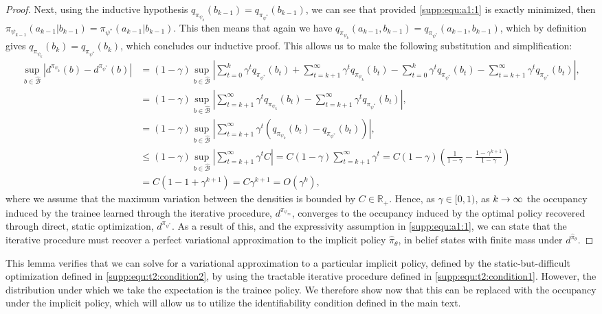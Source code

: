 \begin{proof}
    Next, using the inductive hypothesis $q_{\pi_{\psi_k}}(b_{k-1}) = q_{\pi_{\psi^*}}(b_{k-1})$, we can see that provided \eqref{supp:equ:a1:1} is exactly minimized, then $\pi_{\psi_{k-1}}(a_{k-1}|b_{k-1}) = \pi_{\psi^*}(a_{k-1}|b_{k-1})$. This then means that again we have $q_{\pi_{\psi_k}}(a_{k-1},b_{k-1}) = q_{\pi_{\psi^*}}(a_{k-1},b_{k-1})$, which by definition gives $q_{\pi_{\psi_k}}(b_{k}) = q_{\pi_{\psi^*}}(b_{k})$, which concludes our inductive proof. This allows us to make the following substitution and simplification:
    \begin{align}
        \sup_{b \in \hat{\mathcal{B}}} \left|d^{\pi_{\psi_k}}(b)-d^{\pi_{\psi^*}}(b)\right| &= (1-\gamma) \sup_{b \in \hat{\mathcal{B}}} \left| \sum_{t=0}^{k} \gamma^t q_{\pi_{\psi^*}}(b_t) + \sum_{t=k+1}^{\infty} \gamma^t q_{\pi_{\psi_k}}(b_t) - \sum_{t=0}^{k} \gamma^t q_{\pi_{\psi^*}}(b_t) - \sum_{t=k+1}^{\infty} \gamma^t q_{\pi_{\psi^*}}(b_t)\right|, \\
        &= (1-\gamma) \sup_{b \in \hat{\mathcal{B}}} \left| \sum_{t=k+1}^{\infty} \gamma^t q_{\pi_{\psi_k}}(b_t) - \sum_{t=k+1}^{\infty} \gamma^t q_{\pi_{\psi^*}}(b_t)\right| ,\\
        &= (1-\gamma) \sup_{b \in \hat{\mathcal{B}}} \left| \sum_{t=k+1}^{\infty} \gamma^t (q_{\pi_{\psi_k}}(b_t) - q_{\pi_{\psi^*}}(b_t)) \right|, \\
        &\leq (1-\gamma) \sup_{b \in \hat{\mathcal{B}}} \left| \sum_{t=k+1}^{\infty} \gamma^t C \right|
        = C (1-\gamma) \sum_{t=k+1}^{\infty} \gamma^t = C (1-\gamma) \left(\frac{1}{1-\gamma} - \frac{1-\gamma^{k+1}}{1-\gamma} \right)
        \\
        &= C(1 - 1 + \gamma^{k+1}) = C\gamma^{k+1} = O(\gamma^{k}),
    \end{align}
    where we assume that the maximum variation between the densities is bounded by $C \in \mathbb{R}_+$.  Hence, as $\gamma \in [0, 1)$, as $k\rightarrow\infty$ the occupancy induced by the trainee learned through the iterative procedure, $d^{\pi_{\psi_{\infty}}}$, converges to the occupancy induced by the optimal policy recovered through direct, static optimization, $d^{\pi_{\psi^*}}$.  As a result of this, and the expressivity assumption in \eqref{supp:equ:a1:1}, we can state that the iterative procedure must recover a perfect variational approximation to the implicit policy $\hat{\pi}_{\theta}$, in belief states with finite mass under $d^{\hat{\pi}_{\theta}}$. 
\end{proof}

This lemma verifies that we can solve for a variational approximation to a particular implicit policy, defined by the static-but-difficult optimization defined in \eqref{supp:equ:t2:condition2}, by using the tractable iterative procedure defined in \eqref{supp:equ:t2:condition1}. However, the distribution under which we take the expectation is the trainee policy.  We therefore show now that this can be replaced with the occupancy under the implicit policy, which will allow us to utilize the identifiability condition defined in the main text.

